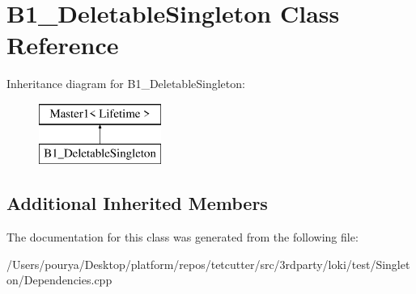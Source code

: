 \hypertarget{classB1__DeletableSingleton}{}\section{B1\+\_\+\+Deletable\+Singleton Class Reference}
\label{classB1__DeletableSingleton}
Inheritance diagram for B1\+\_\+\+Deletable\+Singleton\+:\begin{figure}[H]
\begin{center}
\leavevmode
\includegraphics[height=2.000000cm]{classB1__DeletableSingleton}
\end{center}
\end{figure}
\subsection*{Additional Inherited Members}


The documentation for this class was generated from the following file\+:\begin{DoxyCompactItemize}
\item 
/\+Users/pourya/\+Desktop/platform/repos/tetcutter/src/3rdparty/loki/test/\+Singleton/Dependencies.\+cpp\end{DoxyCompactItemize}
